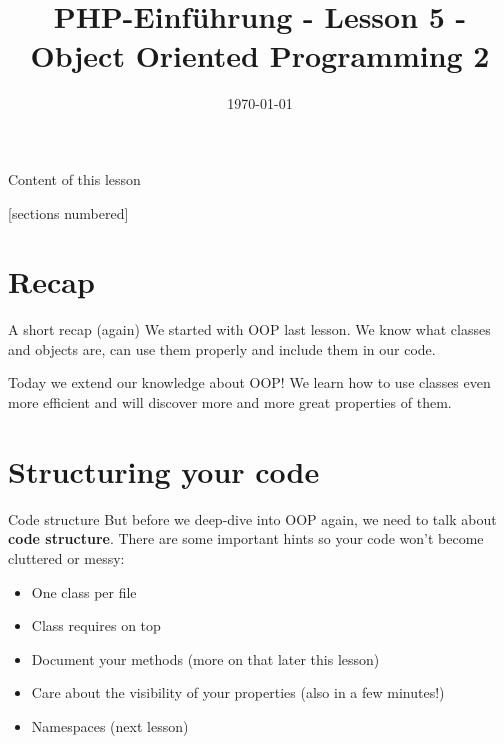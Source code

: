 


\newcommand{\topic}{
	PHP-Einführung - Lesson 5 - Object Oriented Programming 2
}

\title{\topic}
\date{\today}



\maketitle

\begin{frame}{Content of this lesson}

	[sections numbered]
	\tableofcontents

\end{frame}

\section{Recap}

\begin{frame}{A short recap (again)}
	We started with OOP last lesson. We know what classes and objects are, can use them properly and include them in our code.\pause

	Today we extend our knowledge about OOP! We learn how to use classes even more efficient and will discover more and more great properties of them.
\end{frame}

\section{Structuring your code}

\begin{frame}{Code structure}
	But before we deep-dive into OOP again, we need to talk about \textbf{code structure}. There are some important hints so your code won't become cluttered or messy: \pause
	
	\begin{itemize}
	\item One class per file\pause
	\item Class requires on top\pause
	\item Document your methods (more on that later this lesson)\pause
	\item Care about the visibility of your properties (also in a few minutes!)\pause
	\item Namespaces (next lesson)\pause
	\end{itemize}
\end{frame}

